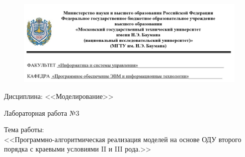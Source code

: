 \documentclass[a4paper,12pt]{article}
\begin{document}
	
	\begin{figure}[h!]
		\begin{center}
			{\includegraphics[scale = 0.4]{titul.jpg}}
			\label{titul}
		\end{center}
	\end{figure}
	
	\vspace*{15mm} 
	
	\huge
	\begin{center}
		Дисциплина: <<Моделирование>>
	\end{center}
	
	\begin{center}
		Лабораторная работа №3
	\end{center}

	
	\huge
	\begin{center}
		Тема работы:\\
		<<Программно-алгоритмическая реализация моделей на основе ОДУ второго порядка
		с краевыми условиями II и III рода.>>
	\end{center}
	\vspace*{30mm} 
	
\end{document}
